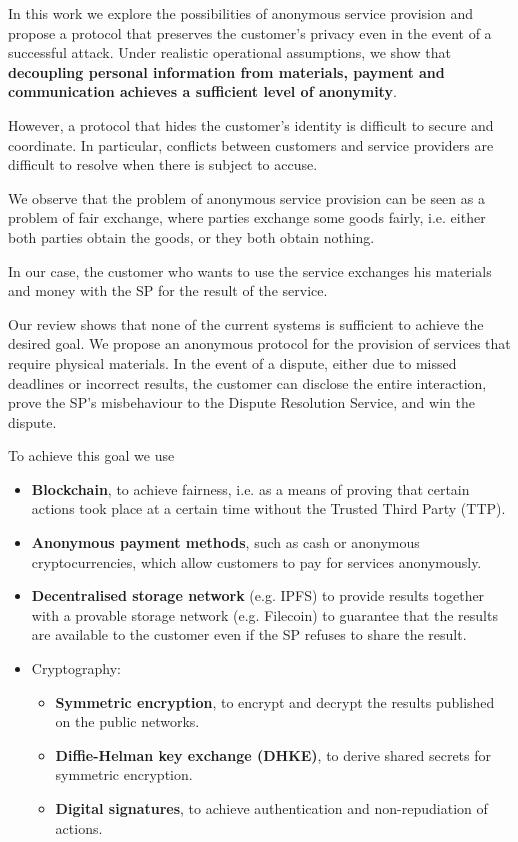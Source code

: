 \documentclass[pdftex,twocolumn,epjc3]{svjour3}
\begin{document}
In this work we explore the possibilities of anonymous service provision and propose a protocol that preserves the customer's privacy even in the event of a successful attack. Under realistic operational assumptions, we show that \textbf{decoupling personal information from materials, payment and communication achieves a sufficient level of anonymity}.

However, a protocol that hides the customer's identity is difficult to secure and coordinate. In particular, conflicts between customers and service providers are difficult to resolve when there is subject to accuse.

We observe that the problem of anonymous service provision can be seen as a problem of fair exchange, where parties exchange some goods fairly, i.e. either both parties obtain the goods, or they both obtain nothing.

In our case, the customer who wants to use the service exchanges his materials and money with the SP for the result of the service.

Our review shows that none of the current systems is sufficient to achieve the desired goal. We propose an anonymous protocol for the provision of services that require physical materials. In the event of a dispute, either due to missed deadlines or incorrect results, the customer can disclose the entire interaction, prove the SP's misbehaviour to the Dispute Resolution Service, and win the dispute.

To achieve this goal we use
\begin{itemize}
    \item \textbf{Blockchain}, to achieve fairness, i.e. as a means of proving that certain actions took place at a certain time without the Trusted Third Party (TTP).
    \item \textbf{Anonymous payment methods}, such as cash or anonymous cryptocurrencies, which allow customers to pay for services anonymously.
    \item \textbf{Decentralised storage network} (e.g. IPFS) to provide results together with a provable storage network (e.g. Filecoin) to guarantee that the results are available to the customer even if the SP refuses to share the result.
    
    \item Cryptography:
    \begin{itemize}
        \item \textbf{Symmetric encryption}, to encrypt and decrypt the results published on the public networks.
        \item \textbf{Diffie-Helman key exchange (DHKE)}, to derive shared secrets for symmetric encryption.
        \item \textbf{Digital signatures}, to achieve authentication and non-repudiation of actions. 
    \end{itemize}
    
\end{itemize}
\end{document}
